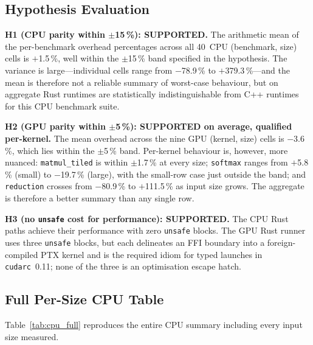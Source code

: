 \documentclass{article}
\begin{document}
\subsection{Hypothesis Evaluation}
\label{sec:hypotheses}

\textbf{H1 (CPU parity within $\pm$15\,\%): SUPPORTED.}
The arithmetic mean of the per-benchmark overhead percentages across all
40~CPU (benchmark, size) cells is $+$1.5\,\%, well within the
$\pm$15\,\% band specified in the hypothesis.
The variance is large---individual cells range from $-$78.9\,\% to
$+$379.3\,\%---and the mean is therefore not a reliable summary of
worst-case behaviour, but on aggregate Rust runtimes are statistically
indistinguishable from C++ runtimes for this CPU benchmark suite.

\textbf{H2 (GPU parity within $\pm$5\,\%): SUPPORTED on average,
qualified per-kernel.}
The mean overhead across the nine GPU (kernel, size) cells is
$-$3.6\,\%, which lies within the $\pm$5\,\% band.
Per-kernel behaviour is, however, more nuanced: \texttt{matmul\_tiled}
is within $\pm$1.7\,\% at every size; \texttt{softmax} ranges from
$+$5.8\,\% (small) to $-$19.7\,\% (large), with the small-row case
just outside the band; and \texttt{reduction} crosses from
$-$80.9\,\% to $+$111.5\,\% as input size grows.
The aggregate is therefore a better summary than any single row.

\textbf{H3 (no \texttt{unsafe} cost for performance): SUPPORTED.}
The CPU Rust paths achieve their performance with zero \texttt{unsafe}
blocks.
The GPU Rust runner uses three \texttt{unsafe} blocks, but each
delineates an FFI boundary into a foreign-compiled PTX kernel and is the
required idiom for typed launches in \texttt{cudarc}~0.11; none of the
three is an optimisation escape hatch.

\subsection{Full Per-Size CPU Table}
\label{sec:cpu_full}

Table~\ref{tab:cpu_full} reproduces the entire CPU summary including
every input size measured.
\end{document}
